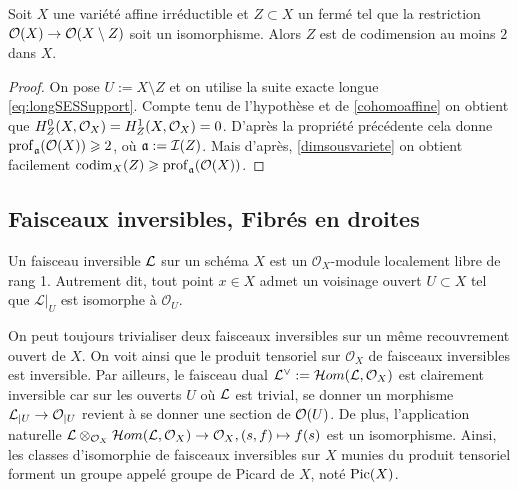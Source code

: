 \begin{cor}\label{cohomcodimgeq2}
Soit $X$ une variété affine irréductible et $Z\subset X$ un fermé tel que la restriction $\mathcal{O}(X)\rightarrow \mathcal{O}(X\setminus Z)$ soit un isomorphisme. Alors $Z$ est de codimension au moins $2$ dans $X$.
\end{cor}
\begin{proof}
On pose $U:=X\setminus Z$ et on utilise la suite exacte longue \ref{eq:longSESSupport}. Compte tenu de l'hypothèse et de \ref{cohomoaffine} on obtient que $H^0_Z(X,\mathcal{O}_X)=H^1_Z(X,\mathcal{O}_X)=0$. D'après la propriété précédente cela donne $\operatorname{prof}_\mathfrak{a}(\mathcal{O}(X))\geqslant 2$, où $\mathfrak{a}:=\mathcal{I}(Z)$. Mais d'après, \ref{dimsousvariete} on obtient facilement $\operatorname{codim}_X(Z)\geqslant \operatorname{prof}_\mathfrak{a}(\mathcal{O}(X))$.
\end{proof}


\subsection{Faisceaux inversibles, Fibrés en droites}
\begin{defn}
Un faisceau inversible $\mathcal{L}$ sur un schéma $X$ est un $\mathcal{O}_X$-module localement libre de rang 1. Autrement dit, tout point $x\in X$ admet un voisinage ouvert $U \subset X$ tel que ${\mathcal L}|_U$ est isomorphe à ${\mathcal O}_U$.
\end{defn}

On peut toujours trivialiser deux faisceaux inversibles sur un même recouvrement ouvert de $X$. On voit ainsi que le produit tensoriel sur $\mathcal{O}_X$ de faisceaux inversibles est inversible. Par ailleurs, le faisceau dual $\mathcal{L}^\vee:=\mathcal{H} om(\mathcal{L},\mathcal{O}_X)$ est clairement inversible car sur les ouverts $U$ où $\mathcal{L}$ est trivial, se donner un morphisme $\mathcal{L}_{|U}\rightarrow\mathcal{O}_{|U}$ revient à se donner une section de $\mathcal{O}(U)$. De plus, l'application naturelle $\mathcal{L}\otimes_{\mathcal{O}_X} \mathcal{H} om(\mathcal{L},\mathcal{O}_X)\rightarrow \mathcal{O}_X, (s,f)\mapsto f(s)$ est un isomorphisme. Ainsi, les classes d'isomorphie de faisceaux inversibles sur $X$ munies du produit tensoriel forment un groupe appelé groupe de Picard de $X$, noté $\operatorname{Pic}(X)$. 

